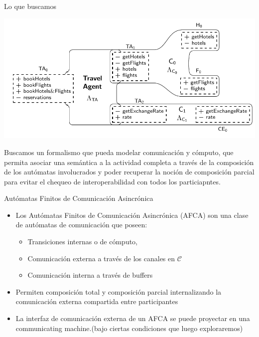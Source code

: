 \documentclass[10pt,xcolor={table,dvipsnames},t]{beamer}
\begin{document}

\begin{frame}{Lo que buscamos}
\begin{center}
    \includegraphics[scale=0.5]{images/ARN0.png}
\end{center}
Buscamos un formalismo que pueda modelar comunicación y cómputo, que permita asociar una semántica a la actividad completa a través de la composición de los autómatas involucrados y poder recuperar la noción de composición parcial para evitar el chequeo de interoperabilidad con todos los particiapntes.

\end{frame}

\begin{frame}{Autómatas Finitos de Comunicación Asincrónica}
\begin{itemize}
    \item Los Autómatas Finitos de Comunicación Asincrónica (AFCA) son una clase de autómatas de comunicación que poseen:
    \begin{itemize}
        \item Transiciones internas o de cómputo,
        \item Comunicación externa a través de los canales en $\mathcal{C}$
        \item Comunicación interna a través de buffers
    \end{itemize} 
    \item Permiten composición total y composición parcial internalizando la comunicación externa compartida entre participantes
    \item La interfaz de comunicación externa de un AFCA se puede proyectar en una communicating machine.(bajo ciertas condiciones que luego exploraremos)
\end{itemize}
\end{frame}
\end{document}
